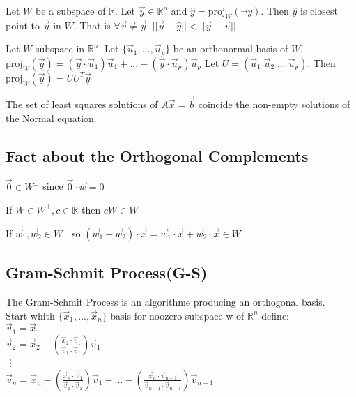 \documentclass[5pt]{article}
\begin{document}
\begin{multicols}{2}
\begin{theorem}
  Let $W$ be a subspace of $\mathbb{R}$. Let $\vec{y}\in\mathbb{R}^n$ and $\hat{y}=\text{proj}_W(\vec{}y)$. 
  Then $\hat{y}$ is closest point to $\vec{y}$ in $W$. That is $\forall\vec{v}\ne\vec{y}\;\; ||\vec{y}-\hat{y}||<||\vec{y}-\vec{v}||$  
\end{theorem}

\begin{theorem}
  Let $W$ subspace in $\mathbb{R}^n$. 
  Let $\{\vec{u}_1, ..., \vec{u}_p\}$ be an orthonormal basis of  $W$.
  $\text{proj}_W(\vec{y})=(\vec{y}\cdot\vec{u}_1)\vec{u}_1 + ... + (\vec{y}\cdot\vec{u}_p)\vec{u}_p$
  Let $U=(\vec{u}_1\; \vec{u}_2\; ...\; \vec{u}_p)$. Then $\text{proj}_W(\vec{y})=UU^T\vec{y}$
\end{theorem}

\begin{theorem}
  The set of least squares solutions of $A\vec{x}=\vec{b}$ coincide the non-empty solutions of the Normal equation.
\end{theorem}

\subsection{Fact about the Orthogonal Complements}
\begin{itemize*}
  \item $\vec{0}\in W^\perp$ since $\vec{0}\cdot\vec{w}=0$
  \item If $W\in W^\perp, c\in \mathbb{R}$ then $cW\in W^\perp$
  \item If $\vec{w}_1,\vec{w}_2\in W^\perp$ so $(\vec{w}_1+\vec{w}_2)\cdot\vec{x}=\vec{w}_1\cdot\vec{x}+\vec{w}_2\cdot\vec{x}\in W$
\end{itemize*}

\subsection{Gram-Schmit Process(G-S)}
The Gram-Schmit Process is an algorithme producing an orthogonal basis.\\
Start whith $\{\vec{x}_1,...,\vec{x}_n\}$ basis for noozero subspace w of $\mathbb{R}^n$ define:\\
$\vec{v}_1=\vec{x}_1$\\
$\vec{v}_2=\vec{x}_2 -\left(\frac{\vec{x}_2\cdot\vec{v}_1}{\vec{v}_1\cdot\vec{v}_1}\right)\vec{v}_1$\\
\vdots\\
$\vec{v}_n=\vec{x}_n -\left(\frac{\vec{x}_n\cdot\vec{v}_1}{\vec{v}_1\cdot\vec{v}_1}\right)\vec{v}_1- ... -\left(\frac{\vec{x}_n\cdot\vec{v}_{n-1}}{\vec{v}_{n-1}\cdot\vec{v}_{n-1}}\right)\vec{v}_{n-1}$\\


\end{multicols}
\end{document}
